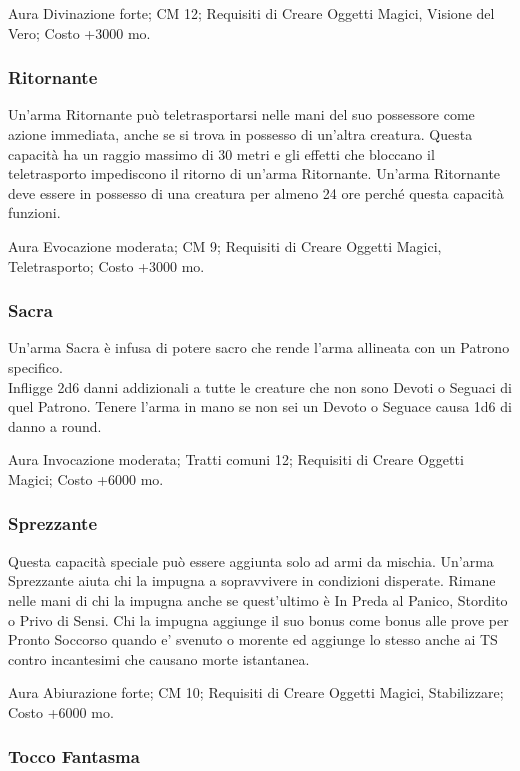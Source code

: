\begin{multicols}{2}
Aura Divinazione forte; CM 12; Requisiti di Creare Oggetti Magici, Visione del Vero; Costo +3000 mo.

\subsubsection{Ritornante}

Un'arma Ritornante può teletrasportarsi nelle mani del suo possessore come azione immediata, anche se si trova in possesso di un'altra creatura. Questa capacità ha un raggio massimo di 30 metri e gli effetti che bloccano il teletrasporto impediscono il ritorno di un'arma Ritornante. Un'arma Ritornante deve essere in possesso di una creatura per almeno 24 ore perché questa capacità funzioni.

Aura Evocazione moderata; CM 9; Requisiti di Creare Oggetti Magici, Teletrasporto; Costo +3000 mo.

\subsubsection{Sacra}

Un'arma Sacra è infusa di potere sacro che rende l'arma allineata con un Patrono specifico. \\
Infligge 2d6 danni addizionali a tutte le creature che non sono Devoti o Seguaci di quel Patrono. Tenere l'arma in mano se non sei un Devoto o Seguace causa 1d6 di danno a round.

Aura Invocazione moderata; Tratti comuni 12; Requisiti di Creare Oggetti Magici; Costo +6000 mo.


\subsubsection{Sprezzante}

Questa capacità speciale può essere aggiunta solo ad armi da mischia. Un'arma Sprezzante aiuta chi la impugna a sopravvivere in condizioni disperate. Rimane nelle mani di chi la impugna anche se quest'ultimo è In Preda al Panico, Stordito o Privo di Sensi. Chi la impugna aggiunge il suo bonus come bonus alle prove per Pronto Soccorso quando e' svenuto  o morente ed aggiunge lo stesso anche ai TS contro incantesimi che causano morte istantanea.

Aura Abiurazione forte; CM 10; Requisiti di Creare Oggetti Magici, Stabilizzare; Costo +6000 mo.

\subsubsection{Tocco Fantasma}


\end{multicols}
